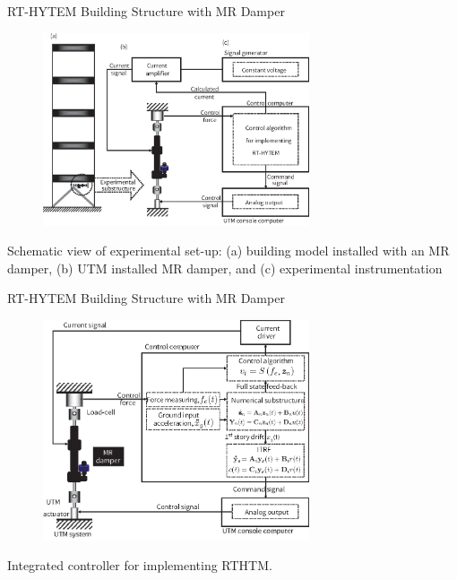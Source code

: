 \documentclass[usepdftitle=false]{beamer}
\begin{document}
\begin{frame}{RT-HYTEM Building Structure with MR Damper}
\begin{figure}[ht]
\centering
\includegraphics[width=0.7\textwidth] {figure/8-3.eps}
\label{fig:8-3}
\end{figure}
Schematic view of experimental set-up: (a) building model installed with an MR damper, (b) UTM installed MR damper, and (c) experimental instrumentation
\end{frame}

\begin{frame}{RT-HYTEM Building Structure with MR Damper}
\begin{figure}[H]
\centering
\includegraphics[width=0.7\textwidth] {figure/8-7.eps}
\label{fig:8-7}
\end{figure}
Integrated controller for implementing RTHTM.
\end{frame}
\end{document}
